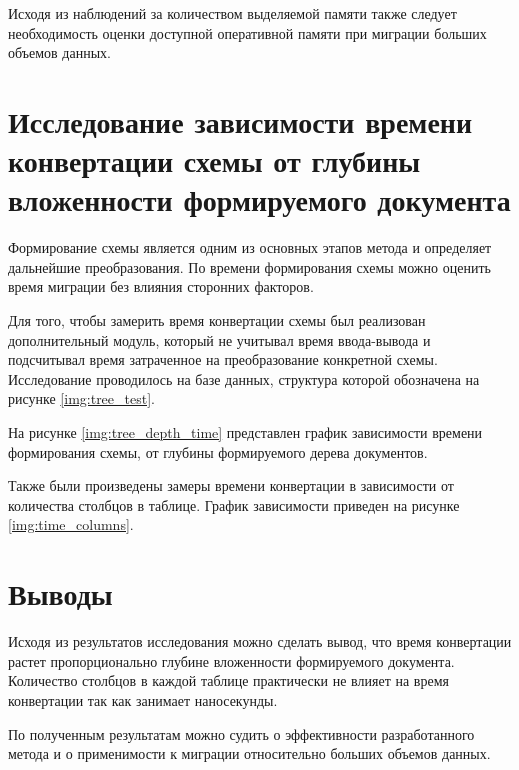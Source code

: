Исходя из наблюдений за количеством выделяемой памяти также следует 
необходимость оценки доступной оперативной памяти при миграции больших объемов данных.  

\clearpage

\section{Исследование зависимости времени конвертации схемы от глубины вложенности формируемого документа}
Формирование схемы является одним из основных этапов метода и определяет дальнейшие преобразования.
По времени формирования схемы можно оценить время миграции без влияния сторонних факторов.

Для того, чтобы замерить время конвертации схемы был реализован дополнительный модуль, 
который не учитывал время ввода-вывода и подсчитывал время затраченное на преобразование конкретной схемы.
Исследование проводилось на базе данных, структура которой обозначена на рисунке \ref{img:tree_test}.

На рисунке \ref{img:tree_depth_time} представлен график зависимости времени формирования схемы, 
от глубины формируемого дерева документов.


Также были произведены замеры времени конвертации в зависимости от количества столбцов в таблице.
\clearpage
График зависимости приведен на рисунке \ref{img:time_columns}.


\section*{Выводы}
Исходя из результатов исследования можно сделать вывод, 
что время конвертации растет пропорционально глубине вложенности формируемого документа.
Количество столбцов в каждой таблице практически не влияет на время конвертации так как занимает наносекунды.
 
По полученным результатам можно судить о эффективности разработанного метода 
и о применимости к миграции относительно больших объемов данных.

